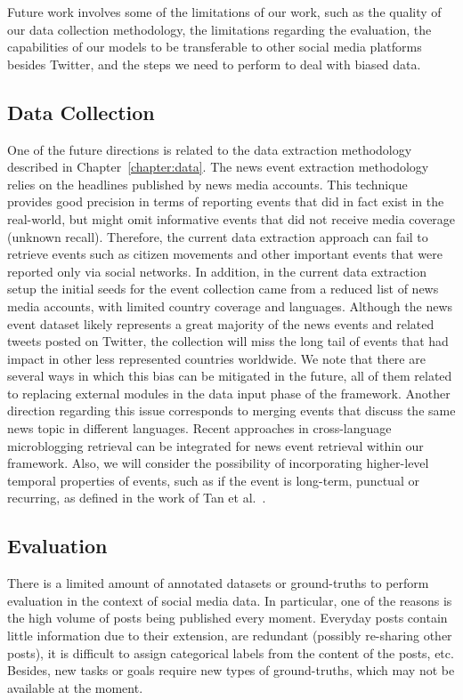 Future work involves some of the limitations of our work, such as the quality of
our data collection methodology, the limitations regarding the evaluation, the
capabilities of our models to be transferable to other social media platforms
besides Twitter, and the steps we need to perform to deal with biased data.

\subsection*{Data Collection}
One of the future directions is related to the data extraction methodology
described in Chapter~\ref{chapter:data}. 
%
The news event extraction methodology relies on the headlines published by news
media accounts. 
%
This technique provides good precision in terms of reporting events that did in
fact exist in the real-world, but might omit informative events that did not
receive media coverage (unknown recall).
%
Therefore, the current data extraction approach can fail to retrieve events such
as citizen movements and other important events that were reported only via
social networks.  
%
In addition, in the current data extraction setup the initial seeds for the
event collection came from a reduced list of news media accounts, with limited
country coverage and languages.
%
Although the news event dataset likely represents a great majority of the news
events and related tweets posted on Twitter, the collection will miss the long
tail of events that had impact in other less represented countries worldwide. 
%
We note that there are several ways in which this bias can be mitigated in the
future, all of them related to replacing external modules in the data input
phase of the framework.
%
Another direction regarding this issue corresponds to merging events that
discuss the same news topic in different languages. 
%
Recent approaches in cross-language microblogging retrieval
\cite{Godavarthy2016} can be integrated for news event retrieval within our
framework.
%
Also, we will consider the possibility of incorporating higher-level temporal
properties of events, such as if the event is long-term, punctual or recurring,
as defined in the work of Tan et al.~\cite{st-model_2009}.


\subsection*{Evaluation}

There is a limited amount of annotated datasets or ground-truths to perform
evaluation in the context of social media data.
%
In particular, one of the reasons is the high volume of posts being
published every moment.
%
Everyday posts contain little information due to their extension, are redundant
(possibly re-sharing other posts), it is difficult to assign categorical
labels from the content of the posts, etc.
%
Besides, new tasks or goals require new types of ground-truths, which may not be
available at the moment.

